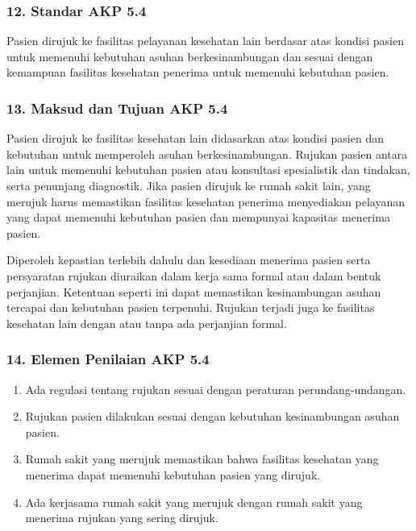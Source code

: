 \documentclass[
]{book}
\providecommand{\tightlist}{%
  \setlength{\itemsep}{0pt}\setlength{\parskip}{0pt}}
\begin{document}
\hypertarget{standar-akp-5.4}{%
\subsubsection*{12. Standar AKP 5.4}\label{standar-akp-5.4}}

Pasien dirujuk ke fasilitas pelayanan kesehatan lain berdasar atas kondisi pasien untuk memenuhi kebutuhan asuhan berkesinambungan dan sesuai dengan kemampuan fasilitas kesehatan penerima untuk memenuhi kebutuhan pasien.

\hypertarget{maksud-dan-tujuan-akp-5.4}{%
\subsubsection*{13. Maksud dan Tujuan AKP 5.4}\label{maksud-dan-tujuan-akp-5.4}}

Pasien dirujuk ke fasilitas kesehatan lain didasarkan atas kondisi pasien dan kebutuhan untuk memperoleh asuhan berkesinambungan. Rujukan pasien antara lain untuk memenuhi kebutuhan pasien atau konsultasi spesialistik dan tindakan, serta penunjang diagnostik. Jika pasien dirujuk ke rumah sakit lain, yang merujuk harus memastikan fasilitas kesehatan penerima menyediakan pelayanan yang dapat memenuhi kebutuhan pasien dan mempunyai kapasitas menerima pasien.

Diperoleh kepastian terlebih dahulu dan kesediaan menerima pasien serta persyaratan rujukan diuraikan dalam kerja sama formal atau dalam bentuk perjanjian. Ketentuan seperti ini dapat memastikan kesinambungan asuhan tercapai dan kebutuhan pasien terpenuhi. Rujukan terjadi juga ke fasilitas kesehatan lain dengan atau tanpa ada perjanjian formal.

\hypertarget{elemen-penilaian-akp-5.4}{%
\subsubsection*{14. Elemen Penilaian AKP 5.4}\label{elemen-penilaian-akp-5.4}}

\begin{enumerate}
\def\labelenumi{\alph{enumi}.}
\tightlist
\item
  Ada regulasi tentang rujukan sesuai dengan peraturan perundang-undangan.
\item
  Rujukan pasien dilakukan sesuai dengan kebutuhan kesinambungan asuhan pasien.
\item
  Rumah sakit yang merujuk memastikan bahwa fasilitas kesehatan yang menerima dapat memenuhi kebutuhan pasien yang dirujuk.
\item
  Ada kerjasama rumah sakit yang merujuk dengan rumah sakit yang menerima rujukan yang sering dirujuk.
\end{enumerate}
\end{document}

